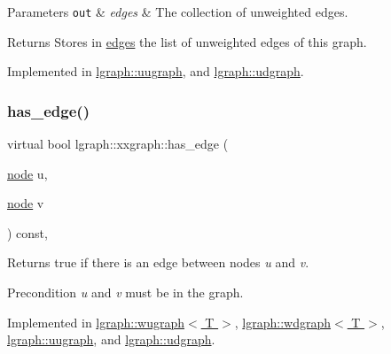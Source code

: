 \begin{DoxyParams}[1]{Parameters}
\mbox{\tt out}  & {\em edges} & The collection of unweighted edges. \\
\hline
\end{DoxyParams}
\begin{DoxyReturn}{Returns}
Stores in \hyperlink{classlgraph_1_1uxgraph_abf4c5ce2b595780e6ba80f06bdd0be16}{edges} the list of unweighted edges of this graph. 
\end{DoxyReturn}


Implemented in \hyperlink{classlgraph_1_1uugraph_a791ae88221ed4c1a78173fbf9f037720}{lgraph\+::uugraph}, and \hyperlink{classlgraph_1_1udgraph_a91ee7ee8d37197f9441a93f1e19a1f29}{lgraph\+::udgraph}.

\mbox{\label{classlgraph_1_1xxgraph_a4e36e9722df020df6ba1dc47b7d9d830}} 
\subsubsection{\texorpdfstring{has\+\_\+edge()}{has\_edge()}}
{\footnotesize\ttfamily virtual bool lgraph\+::xxgraph\+::has\+\_\+edge (\begin{DoxyParamCaption}\item[{\hyperlink{namespacelgraph_a397169dd66adf725210a30fb7251773e}{node}}]{u,  }\item[{\hyperlink{namespacelgraph_a397169dd66adf725210a30fb7251773e}{node}}]{v }\end{DoxyParamCaption}) const\hspace{0.3cm}{\ttfamily [pure virtual]}, {\ttfamily [inherited]}}



Returns true if there is an edge between nodes {\itshape u} and {\itshape v}. 

\begin{DoxyPrecond}{Precondition}
{\itshape u} and {\itshape v} must be in the graph. 
\end{DoxyPrecond}


Implemented in \hyperlink{classlgraph_1_1wugraph_a203b19538ef6662a793999973801be93}{lgraph\+::wugraph$<$ T $>$}, \hyperlink{classlgraph_1_1wdgraph_a0b0f9b2cec5dbdd7eb84305c588e31c1}{lgraph\+::wdgraph$<$ T $>$}, \hyperlink{classlgraph_1_1uugraph_a36bc44714a043830eff62b5aebe5a9c3}{lgraph\+::uugraph}, and \hyperlink{classlgraph_1_1udgraph_a31370a81898abdc230ad2a3b0d274187}{lgraph\+::udgraph}.

